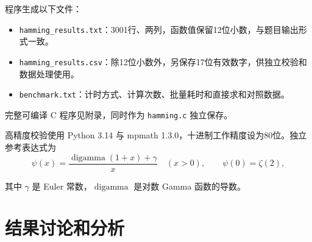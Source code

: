 \documentclass[UTF8,fontset=fandol,zihao=-4,a4paper]{ctexart}
\newcommand{\psif}{\psi}
\begin{document}
程序生成以下文件：
\begin{itemize}
 \item \texttt{hamming\_results.txt}：3001行、两列，函数值保留12位小数，与题目输出形式一致。
 \item \texttt{hamming\_results.csv}：除12位小数外，另保存17位有效数字，供独立校验和数据处理使用。
 \item \texttt{benchmark.txt}：计时方式、计算次数、批量耗时和直接求和对照数据。
\end{itemize}
完整可编译 C 程序见附录，同时作为 \texttt{hamming.c} 独立保存。


高精度校验使用 Python 3.14 与 mpmath 1.3.0，十进制工作精度设为80位。独立参考表达式为
\begin{equation}\label{eq:reference}
 \psif(x)=\frac{\operatorname{digamma}(1+x)+\gamma}{x}\quad(x>0),
 \qquad \psif(0)=\zeta(2),
\end{equation}

其中 $\gamma$ 是 Euler 常数，$\operatorname{digamma}$ 是对数 Gamma 函数的导数。




\section{结果讨论和分析}
\end{document}
